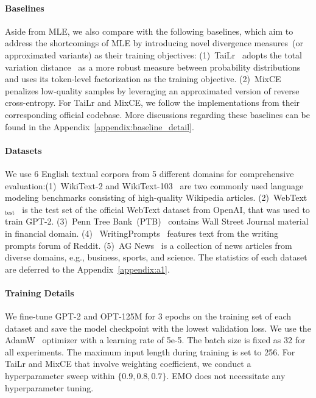 \paragraph{Baselines}
Aside from MLE, we also compare with the following baselines, which aim to address the shortcomings of MLE by introducing novel divergence measures~(or approximated variants) as their training objectives: 
(1)~TaiLr~\citep{tailr} adopts the total variation distance~\citep{van2014probability} as a more robust measure between probability distributions and uses its token-level factorization as the training objective. (2)~MixCE~\citep{mixce} penalizes low-quality samples by leveraging an approximated version of reverse cross-entropy. For TaiLr and MixCE, we follow the implementations from their corresponding official codebase.
More discussions regarding these baselines can be found in the Appendix~\ref{appendix:baseline_detail}.
\paragraph{Datasets}
We use 6 English textual corpora from 5 different domains for comprehensive evaluation:(1)~WikiText-2 and WikiText-103~\citep{wikitext} are two commonly used language modeling benchmarks consisting of high-quality Wikipedia articles. (2)~WebText$_{\text{test}}$~\citep{webtext} is the test set of the official WebText dataset from OpenAI, that was used to train GPT-2. 
(3)~Penn Tree Bank~(PTB)~\citep{ptb} contains Wall Street Journal material in financial domain. (4)~ WritingPrompts~\citep{wp} features text from the writing prompts forum of Reddit. (5)~AG News~\citep{agnews} is a collection of news articles from diverse domains, e.g., business, sports, and science. The statistics of each dataset are deferred to the Appendix~\ref{appendix:a1}.

\paragraph{Training Details}
We fine-tune GPT-2 and OPT-125M for 3 epochs on the training set of each dataset and save the model checkpoint with the lowest validation loss. We use the AdamW~\citep{adamw} optimizer with a learning rate of 5e-5. The batch size is fixed as 32 for all experiments. The maximum input length during training is set to 256. For TaiLr and MixCE that involve weighting coefficient, we conduct a hyperparameter sweep within $\{0.9, 0.8, 0.7\}$. EMO does not necessitate any hyperparameter tuning. 

